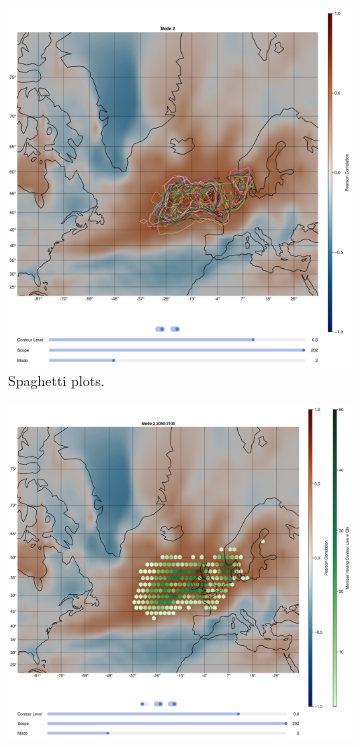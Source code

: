 \begin{figure}[!htb]
  \begin{subfigure}[b]{0.48\textwidth}
    \includegraphics[width=\textwidth]{figures/ivt_pr_cor_mode2_ssp126.png}
    \caption{Spaghetti plots.}
    \label{fig:comparsion member vis spaghetti}
  \end{subfigure}
  \hfill
  \begin{subfigure}[b]{0.51\textwidth}
    \includegraphics[width=\textwidth]{figures/ivt_pr_cor_mode2_ssp126_hexbin.png}

\end{subfigure}
\end{figure}
